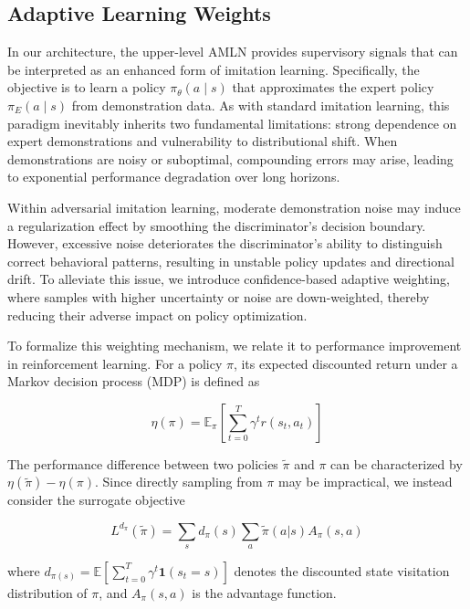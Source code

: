 \documentclass[lettersize,journal]{IEEEtran}
\begin{document}
\subsection{Adaptive Learning Weights}
In our architecture, the upper-level AMLN provides supervisory signals that can be interpreted as an enhanced form of imitation learning. Specifically, the objective is to learn a policy $\pi_\theta(a \mid s)$ that approximates the expert policy $\pi_E(a \mid s)$ from demonstration data. As with standard imitation learning, this paradigm inevitably inherits two fundamental limitations: strong dependence on expert demonstrations and vulnerability to distributional shift. When demonstrations are noisy or suboptimal, compounding errors may arise, leading to exponential performance degradation over long horizons.

Within adversarial imitation learning, moderate demonstration noise may induce a regularization effect by smoothing the discriminator’s decision boundary. However, excessive noise deteriorates the discriminator's ability to distinguish correct behavioral patterns, resulting in unstable policy updates and directional drift. To alleviate this issue, we introduce confidence-based adaptive weighting, where samples with higher uncertainty or noise are down-weighted, thereby reducing their adverse impact on policy optimization.

To formalize this weighting mechanism, we relate it to performance improvement in reinforcement learning. For a policy $\pi$, its expected discounted return under a Markov decision process (MDP) is defined as

\begin{equation}
\eta (\pi)=\mathbb{E}_{\pi} \left[ \sum_{t=0}^{T} \gamma^t r(s_t,a_t) \right]
\end{equation}

The performance difference between two policies $\widetilde{\pi}$ and $\pi$ can be characterized by $\eta(\widetilde{\pi}) - \eta(\pi)$. Since directly sampling from $\pi$ may be impractical, we instead consider the surrogate objective

\begin{equation}
  L^{d_{\pi}}(\widetilde{\pi})=\sum_{s} d_{\pi}(s) \sum_{a} \widetilde{\pi}(a|s) A_{\pi}(s,a)
\end{equation}

where $d_{\pi(s)}=\mathbb{E}[\sum_{t=0}^{T} \gamma^t \mathbf{1}(s_t=s)]$ denotes the discounted state visitation distribution of $\pi$, and $A_\pi(s,a)$ is the advantage function.
\end{document}
